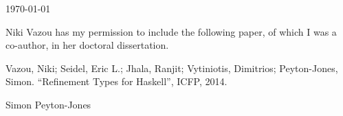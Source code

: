\documentclass{article}
\begin{document}
\today

Niki Vazou has my permission to include the following paper, of which
I was a co-author, in her doctoral dissertation.

Vazou, Niki; Seidel, Eric L.; Jhala, Ranjit; Vytiniotis, Dimitrios; Peyton-Jones, Simon.
``Refinement Types for Haskell'', ICFP, 2014.

\baselineskip
Simon Peyton-Jones
\end{document}
